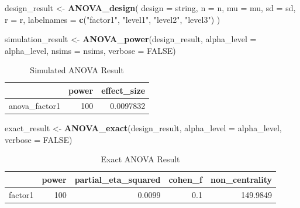 \documentclass[]{book}
\newenvironment{Shaded}{\begin{snugshade}}{\end{snugshade}}
\newcommand{\DataTypeTok}[1]{\textcolor[rgb]{0.13,0.29,0.53}{#1}}
\newcommand{\KeywordTok}[1]{\textcolor[rgb]{0.13,0.29,0.53}{\textbf{#1}}}
\newcommand{\NormalTok}[1]{#1}
\newcommand{\OtherTok}[1]{\textcolor[rgb]{0.56,0.35,0.01}{#1}}
\newcommand{\StringTok}[1]{\textcolor[rgb]{0.31,0.60,0.02}{#1}}
\begin{document}
\begin{Shaded}
\begin{Highlighting}[]
\NormalTok{design_result <-}\StringTok{ }\KeywordTok{ANOVA_design}\NormalTok{(}
  \DataTypeTok{design =}\NormalTok{ string,}
  \DataTypeTok{n =}\NormalTok{ n,}
  \DataTypeTok{mu =}\NormalTok{ mu,}
  \DataTypeTok{sd =}\NormalTok{ sd,}
  \DataTypeTok{r =}\NormalTok{ r,}
  \DataTypeTok{labelnames =} \KeywordTok{c}\NormalTok{(}\StringTok{"factor1"}\NormalTok{, }\StringTok{"level1"}\NormalTok{, }\StringTok{"level2"}\NormalTok{, }\StringTok{"level3"}\NormalTok{)}
\NormalTok{  )}

\NormalTok{simulation_result <-}\StringTok{ }\KeywordTok{ANOVA_power}\NormalTok{(design_result, }
                                 \DataTypeTok{alpha_level =}\NormalTok{ alpha_level, }
                                 \DataTypeTok{nsims =}\NormalTok{ nsims,}
                                 \DataTypeTok{verbose =} \OtherTok{FALSE}\NormalTok{)}
\end{Highlighting}
\end{Shaded}

\begin{table}[t]

\caption{\label{tab:unnamed-chunk-59}Simulated ANOVA Result}
\centering
\begin{tabular}{l|r|r}
\hline
  & power & effect\_size\\
\hline
anova\_factor1 & 100 & 0.0097832\\
\hline
\end{tabular}
\end{table}

\begin{Shaded}
\begin{Highlighting}[]
\NormalTok{exact_result <-}\StringTok{ }\KeywordTok{ANOVA_exact}\NormalTok{(design_result,}
                            \DataTypeTok{alpha_level =}\NormalTok{ alpha_level,}
                            \DataTypeTok{verbose =} \OtherTok{FALSE}\NormalTok{)}
\end{Highlighting}
\end{Shaded}

\begin{table}[t]

\caption{\label{tab:unnamed-chunk-61}Exact ANOVA Result}
\centering
\begin{tabular}{l|r|r|r|r}
\hline
  & power & partial\_eta\_squared & cohen\_f & non\_centrality\\
\hline
factor1 & 100 & 0.0099 & 0.1 & 149.9849\\
\hline
\end{tabular}
\end{table}
\end{document}
